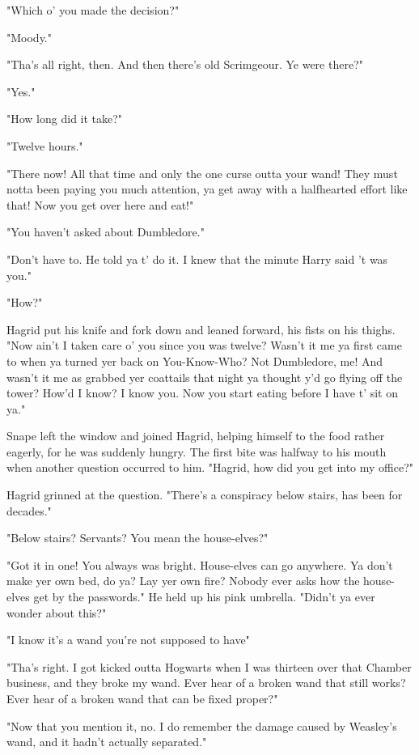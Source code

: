 "Which o' you made the decision?"

"Moody."

"Tha's all right, then. And then there's old Scrimgeour. Ye were there?"

"Yes."

"How long did it take?"

"Twelve hours."

"There now! All that time and only the one curse outta your wand! They must notta been paying you much attention, ya get away with a halfhearted effort like that! Now you get over here and eat!"

"You haven't asked about Dumbledore."

"Don't have to. He told ya t' do it. I knew that the minute Harry said 't was you."

"How{\el}?"

Hagrid put his knife and fork down and leaned forward, his fists on his thighs. "Now ain't I taken care o' you since you was twelve? Wasn't it me ya first came to when ya turned yer back on You-Know-Who? Not Dumbledore, me! And wasn't it me as grabbed yer coattails that night ya thought y'd go flying off the tower? How'd I know? I know you. Now you start eating before I have t' sit on ya."

Snape left the window and joined Hagrid, helping himself to the food rather eagerly, for he was suddenly hungry. The first bite was halfway to his mouth when another question occurred to him. "Hagrid, how did you get into my office?"

Hagrid grinned at the question. "There's a conspiracy below stairs, has been for decades."

"Below stairs? Servants? You mean the house-elves?"

"Got it in one! You always was bright. House-elves can go anywhere. Ya don't make yer own bed, do ya? Lay yer own fire? Nobody ever asks how the house-elves get by the passwords." He held up his pink umbrella. "Didn't ya ever wonder about this?"

"I know it's a wand you're not supposed to have{\el}"

"Tha's right. I got kicked outta Hogwarts when I was thirteen over that Chamber business, and they broke my wand. Ever hear of a broken wand that still works? Ever hear of a broken wand that can be fixed proper?"

"Now that you mention it, no. I do remember the damage caused by Weasley's wand, and it hadn't actually separated."

